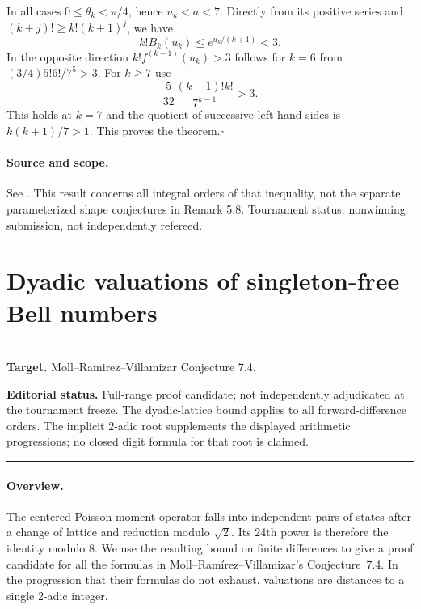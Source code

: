 \documentclass[11pt,a4paper]{article}
\begin{document}
In all cases $0\le\theta_k<\pi/4$, hence $u_k<a<7$.
Directly from its positive series and
$(k+j)!\ge k!(k+1)^j$, we have
\[
 k! B_k(u_k)\le e^{u_k/(k+1)}<3 .
\]
In the opposite direction $k! f^{(k-1)}(u_k)>3$ follows for $k=6$
from $(3/4)5!6!/7^5>3$. For $k\ge7$ use
\[
 \frac{5}{32}\frac{(k-1)!k!}{7^{k-1}}>3 .
\]
This holds at $k=7$ and the quotient of successive left-hand sides
is $k(k+1)/7>1$. This proves the theorem.\hfill$\square$

\paragraph{Source and scope.} See \cite{R22H:qi}. This result concerns all
integral orders of that inequality, not the separate parameterized
shape conjectures in Remark 5.8. Tournament status: nonwinning submission,
not independently refereed.
\endgroup


\clearpage

\section{Dyadic valuations of singleton-free Bell numbers}
\label{section:R23K}
\\[3pt]
\noindent\textbf{Target.} Moll--Ramirez--Villamizar Conjecture 7.4.

\noindent\textbf{Editorial status.} Full-range proof candidate; not independently adjudicated at the tournament freeze. The dyadic-lattice bound applies to all forward-difference orders. The implicit $2$-adic root supplements the displayed arithmetic progressions; no closed digit formula for that root is claimed.

\smallskip\hrule\medskip



\begingroup
\newcommand{\Z}{\mathbb Z}
\newcommand{\val}{v_2}
\setcounter{equation}{0}
\renewcommand{\theequation}{\thesection.\arabic{equation}}
\renewcommand{\theHequation}{R23K.\arabic{equation}}
\paragraph{Overview.}
The centered Poisson moment operator falls into independent pairs of states
after a change of lattice and reduction modulo $\sqrt 2$. Its 24th power is
therefore the identity modulo 8. We use the resulting bound on finite
differences to give a proof candidate for all the formulas in
Moll--Ram\'irez--Villamizar's Conjecture~7.4. In the progression that
their formulas do not exhaust, valuations are distances to a single
2-adic integer.
\end{document}
